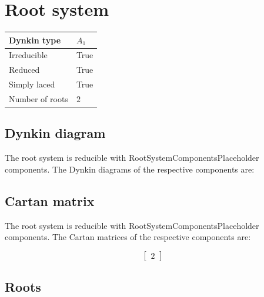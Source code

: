 \documentclass[11pt]{article}
\theoremstyle{definition}
\newif\ifrootsystemirreducible
\begin{document}
\newpage
\section{Root system}

\begin{tabular}{|l|l|}
	\hline
    Dynkin type & $A_1$ \\
	\hline
    Irreducible & True \\
	\hline
    Reduced & True \\
	\hline
	Simply laced & True \\
	\hline
	Number of roots & $2$ \\
	\hline
\end{tabular}

\subsection{Dynkin diagram}

\ifrootsystemirreducible
The root system is irreducible and has Dynkin diagram:
\else
The root system is reducible with RootSystemComponentsPlaceholder components. The Dynkin diagrams of the respective components are:
\fi

\begin{center}
\end{center}

\subsection{Cartan matrix}

\ifrootsystemirreducible
The root system is irreducible and has Cartan matrix:
\else
The root system is reducible with RootSystemComponentsPlaceholder components. The Cartan matrices of the respective components are:
\fi

\[
\left[\begin{matrix}2\end{matrix}\right]
\]

\subsection{Roots}
\end{document}
